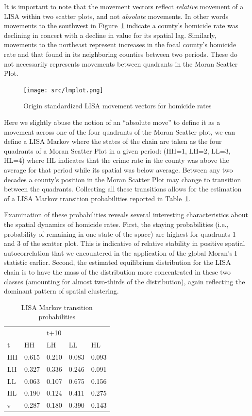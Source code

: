 \documentclass[11pt, titlepage]{article}
\begin{document}
It is important to note that the movement vectors reflect
\emph{relative} movement of a LISA within two scatter plots, and not
\emph{absolute} movements.  In other words movements to the southwest in
Figure~\ref{f:lmplot} indicate a county's homicide rate was declining in
concert with a decline in value for its spatial lag. Similarly,
movements to the northeast represent increases in the focal county's
homicide rate and that found in its neighboring counties between two
periods. These do not necessarily represents movements between quadrants
in the Moran Scatter Plot.


\begin{figure}[ht]
\begin{center}
\texttt{[image: src/lmplot.png]}
\end{center}
\caption{Origin standardized LISA movement vectors for homicide rates}
\label{f:lmplot}
\end{figure}   

Here we slightly abuse the notion of an ``absolute move'' to define it as a
movement across one of the four quadrants of the Moran Scatter plot, we
can define a LISA Markov  where the states of the chain
are taken as the four quadrants of a Moran Scatter Plot in a given
period: (HH=1, LH=2, LL=3, HL=4) where HL indicates that the crime rate
in the county was above the average for that period while its spatial
was below average.  Between any two decades a county's position in the
Moran Scatter Plot may change to transition between the quadrants.
Collecting all these transitions allows for the estimation of a LISA
Markov transition probabilities reported in Table~\ref{t:lm}. 

Examination of these probabilities reveals several interesting
characteristics about the spatial dynamics of homicide rates.  First,
the staying probabilities (i.e., probability of remaining in one state
of the space) are highest for quadrants 1 and 3 of the scatter plot.
This is indicative of relative stability in positive spatial
autocorrelation that we encountered in the application of the global
Moran's I statistic earlier. Second, the estimated equilibrium
distribution for the LISA chain is to have the mass of the distribution
more concentrated in these two classes (amounting for almost two-thirds
of the distribution), again reflecting the dominant pattern of spatial
clustering.

\begin{table}
  \centering
  \small
\begin{tabular}{|l|llll|}\hline
  & &t+10 & &\\
  t&HH&LH&LL&HL\\
  \hline
HH&0.615 &0.210 &0.083 &0.093\\
LH&0.327 &0.336 &0.246 &0.091\\
LL&0.063 &0.107 &0.675 &0.156\\
HL&0.190 &0.124 &0.411 &0.275\\
\hline
$\pi$&0.287 &0.180 &0.390 &0.143\\
\hline
\end{tabular}
\caption{LISA Markov transition probabilities}
\label{t:lm}
\end{table}
\end{document}
